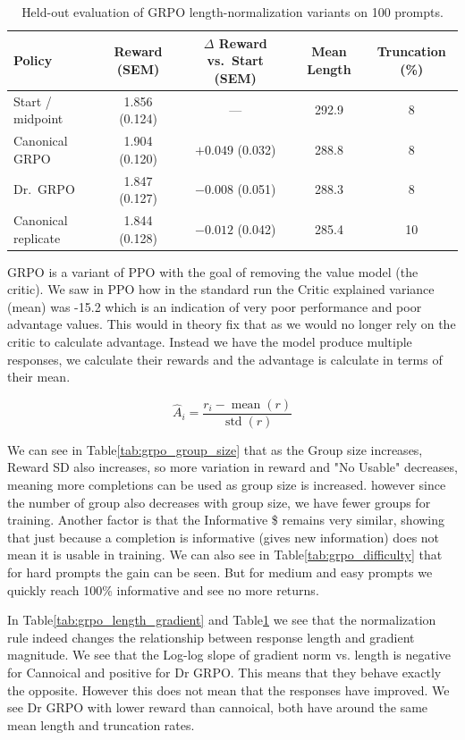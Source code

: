 \documentclass{article}
\begin{document}
\begin{table}[t]
\centering
\small
\caption{Held-out evaluation of GRPO length-normalization variants on 100 prompts.}
\label{tab:grpo_norm_eval}
\begin{tabular}{lcccc}
\toprule
Policy & Reward (SEM) & $\Delta$ Reward vs.\ Start (SEM)
& Mean Length & Truncation (\%) \\
\midrule
Start / midpoint & 1.856 (0.124) & --- & 292.9 & 8 \\
Canonical GRPO   & 1.904 (0.120) & $+0.049$ (0.032) & 288.8 & 8 \\
Dr.\ GRPO        & 1.847 (0.127) & $-0.008$ (0.051) & 288.3 & 8 \\
Canonical replicate & 1.844 (0.128) & $-0.012$ (0.042) & 285.4 & 10 \\
\bottomrule
\end{tabular}
\end{table}

GRPO is a variant of PPO with the goal of removing the value model (the critic). We saw in PPO how in the standard run
the Critic explained variance (mean) was -15.2 which is an indication of very poor performance and poor advantage values. This would in theory fix that
as we would no longer rely on the critic to calculate advantage. Instead we have the model produce multiple responses, we calculate their rewards and the advantage
is calculate in terms of their mean.

\[
\hat A_i =
\frac{r_i-\operatorname{mean}(r)}
{\operatorname{std}(r)}
\]

We can see in Table\ref{tab:grpo_group_size} that as the Group size increases, Reward SD also increases, so more variation in reward and "No Usable" decreases, meaning more completions can be used as group size is increased.
however since the number of group also decreases with group size, we have fewer groups for training. Another factor is that the Informative \$ remains very similar, showing that just because a completion is informative (gives new information)
does not mean it is usable in training. We can also see in Table\ref{tab:grpo_difficulty} that for hard prompts the gain can be seen. But for medium and easy prompts we quickly reach 100\% informative and see no more returns. 

In Table\ref{tab:grpo_length_gradient} and Table\ref{tab:grpo_norm_eval} we see that the normalization rule indeed changes the relationship between response length and gradient magnitude.
We see that the Log-log slope of gradient norm vs. length is negative for Cannoical and positive for Dr GRPO. This means that they behave exactly the opposite. However this does not mean that
the responses have improved. We see Dr GRPO with lower reward than cannoical, both have around the same mean length and truncation rates.
\end{document}
